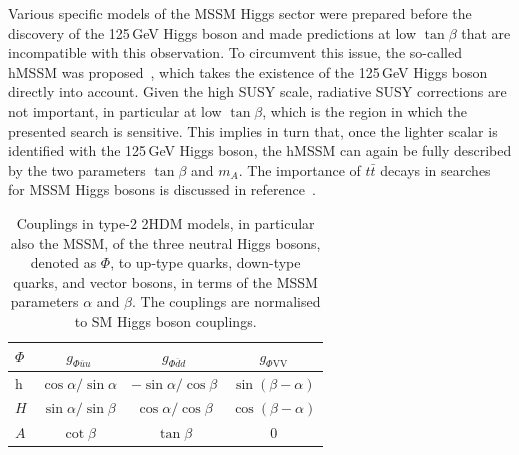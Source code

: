 Various specific models of the MSSM Higgs sector were prepared before the discovery of the 125\,GeV Higgs boson and made predictions at low $\tan\beta$ that are incompatible with this observation. To circumvent this issue, the so-called hMSSM was proposed~\cite{Djouadi:2013uqa}, which takes the existence of the 125\,GeV Higgs boson directly into account. Given the high SUSY scale, radiative SUSY corrections are not important, in particular at low $\tan\beta$, which is the region in which the presented search is sensitive. This implies in turn that, once the lighter scalar is identified with the 125\,GeV Higgs boson, the hMSSM can again be fully described by the two parameters $\tan\beta$ and $m_A$. The importance of $t\bar t$ decays in searches for MSSM Higgs bosons is discussed in reference~\cite{Djouadi:2015jea}.

\begin{table}[h]
\centering
\caption{Couplings in type-2 2HDM models, in particular also the MSSM, of the three neutral Higgs bosons, denoted as $\Phi$, to up-type quarks, down-type quarks, and vector bosons, in terms of the MSSM parameters $\alpha$ and $\beta$. The couplings are normalised to SM Higgs boson couplings.\label{tab:couplings}}
\begin{tabular}{l c c c}
$\Phi$  & $g_{\Phi \overline{u}u}$ & $g_{\Phi \overline{d}d}$ & $g_{\Phi\mathrm{VV}}$ \\ \hline
h       & $\cos\alpha/\sin\alpha$  & $-\sin\alpha/\cos\beta$  & $\sin(\beta-\alpha)$ \\
$H$   & $\sin\alpha/\sin\beta$   & $\cos\alpha/\cos\beta$   & $\cos(\beta-\alpha)$ \\
$A$   & $\cot\beta$              & $\tan\beta$              & 0 \\
\end{tabular}
\end{table}

